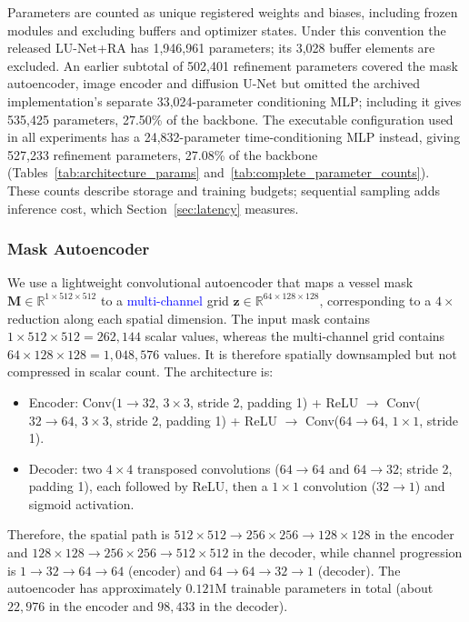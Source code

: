 \documentclass[jimaging,article,submit,pdftex,moreauthors]
  {Definitions/mdpi}
\DeclareRobustCommand{\rev}[1]{\textcolor{blue}{#1}}
\newcommand{\revbegin}{\begingroup\color{blue}}
\DeclareRobustCommand{\rev}[1]{#1}
\newcommand{\revbegin}{\begingroup}
\newcommand{\revend}{\ifhmode\par\fi\endgroup}
\providecommand{\linelabel}[1]{}
\newcommand{\seclabel}[1]{\linelabel{rev:sec:#1}}
\newcommand{\secend}[1]{\linelabel{rev:end:#1}}
\begin{document}
\revbegin{}Parameters are counted as unique registered weights and biases, including frozen modules and excluding buffers and optimizer states. Under this convention the released LU-Net+RA has 1,946,961 parameters; its 3,028 buffer elements are excluded. An earlier subtotal of 502,401 refinement parameters covered the mask autoencoder, image encoder and diffusion U-Net but omitted the archived implementation's separate 33,024-parameter conditioning MLP; including it gives 535,425 parameters, 27.50\% of the backbone. The executable configuration used in all experiments has a 24,832-parameter time-conditioning MLP instead, giving 527,233 refinement parameters, 27.08\% of the backbone (Tables~\ref{tab:architecture_params} and~\ref{tab:complete_parameter_counts}). These counts describe storage and training budgets; sequential sampling adds inference cost, which Section~\ref{sec:latency} measures.\secend{refiner}\revend{}

\subsubsection{Mask Autoencoder}
\label{sec:autoencoder}
\seclabel{autoencoder}

We use a lightweight convolutional autoencoder that maps a vessel mask $\mathbf{M}\in\mathbb{R}^{1\times512\times512}$ to a \rev{multi-channel} grid $\mathbf{z}\in\mathbb{R}^{64\times128\times128}$, corresponding to a $4\times$ reduction along each spatial dimension. The input mask contains $1\times512\times512=262{,}144$ scalar values, whereas the multi-channel grid contains $64\times128\times128=1{,}048{,}576$ values. It is therefore spatially downsampled but not compressed in scalar count. The architecture is:
\begin{itemize}
  \item Encoder: Conv($1\rightarrow32$, $3\times3$, stride 2, padding 1) + ReLU $\rightarrow$ Conv($32\rightarrow64$, $3\times3$, stride 2, padding 1) + ReLU $\rightarrow$ Conv($64\rightarrow64$, $1\times1$, stride 1).
  \item Decoder: two $4\times4$ transposed convolutions ($64\rightarrow64$ and $64\rightarrow32$; stride 2, padding 1), each followed by ReLU, then a $1\times1$ convolution ($32\rightarrow1$) and sigmoid activation.
\end{itemize}

Therefore, the spatial path is $512\times512\rightarrow256\times256\rightarrow128\times128$ in the encoder and $128\times128\rightarrow256\times256\rightarrow512\times512$ in the decoder, while channel progression is $1\rightarrow32\rightarrow64\rightarrow64$ (encoder) and $64\rightarrow64\rightarrow32\rightarrow1$ (decoder). The autoencoder has approximately $0.121$M trainable parameters in total (about $22{,}976$ in the encoder and $98{,}433$ in the decoder).
\end{document}
